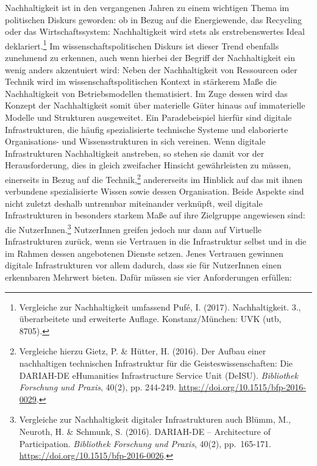 \documentclass[a4paper,
fontsize=11pt,
oneside,
numbers=noperiodatend,
parskip=half-,
bibliography=totoc,
final
]{scrartcl}
\begin{document}
Nachhaltigkeit ist in den vergangenen Jahren zu einem wichtigen Thema im
politischen Diskurs geworden: ob in Bezug auf die Energiewende, das
Recycling oder das Wirtschaftssystem: Nachhaltigkeit wird stets als
erstrebenswertes Ideal deklariert.\footnote{Vergleiche zur
  Nachhaltigkeit umfassend Pufé, I. (2017). Nachhaltigkeit. 3.,
  überarbeitete und erweiterte Auflage. Konstanz/München: UVK (utb,
  8705).} Im wissenschaftspolitischen Diskurs ist dieser Trend ebenfalls
zunehmend zu erkennen, auch wenn hierbei der Begriff der Nachhaltigkeit
ein wenig anders akzentuiert wird: Neben der Nachhaltigkeit von
Ressourcen oder Technik wird im wissenschaftspolitischen Kontext in
stärkerem Maße die Nachhaltigkeit von Betriebsmodellen thematisiert. Im
Zuge dessen wird das Konzept der Nachhaltigkeit somit über materielle
Güter hinaus auf immaterielle Modelle und Strukturen ausgeweitet. Ein
Paradebeispiel hierfür sind digitale Infrastrukturen, die häufig
spezialisierte technische Systeme und elaborierte Organisations- und
Wissensstrukturen in sich vereinen. Wenn digitale Infrastrukturen
Nachhaltigkeit anstreben, so stehen sie damit vor der Herausforderung,
dies in gleich zweifacher Hinsicht gewährleisten zu müssen, einerseits
in Bezug auf die Technik,\footnote{Vergleiche hierzu Gietz, P. \&
  Hütter, H. (2016). Der Aufbau einer nachhaltigen technischen
  Infrastruktur für die Geisteswissenschaften: Die DARIAH-DE eHumanities
  Infrastructure Service Unit (DeISU). \emph{Bibliothek Forschung und
  Praxis}, 40(2), pp. 244-249.
  \url{https://doi.org/10.1515/bfp-2016-0029}.} andererseits im Hinblick
auf das mit ihnen verbundene spezialisierte Wissen sowie dessen
Organisation. Beide Aspekte sind nicht zuletzt deshalb untrennbar
miteinander verknüpft, weil digitale Infrastrukturen in besonders
starkem Maße auf ihre Zielgruppe angewiesen sind: die
NutzerInnen.\footnote{Vergleiche zur Nachhaltigkeit digitaler
  Infrastrukturen auch Blümm, M., Neuroth, H. \& Schmunk, S. (2016).
  DARIAH-DE -- Architecture of Participation. \emph{Bibliothek Forschung
  und Praxis}, 40(2), pp.~165-171.
  \url{https://doi.org/10.1515/bfp-2016-0026}.} NutzerInnen greifen
jedoch nur dann auf Virtuelle Infrastrukturen zurück, wenn sie Vertrauen
in die Infrastruktur selbst und in die im Rahmen dessen angebotenen
Dienste setzen. Jenes Vertrauen gewinnen digitale Infrastrukturen vor
allem dadurch, dass sie für NutzerInnen einen erkennbaren Mehrwert
bieten. Dafür müssen sie vier Anforderungen erfüllen:
\end{document}

